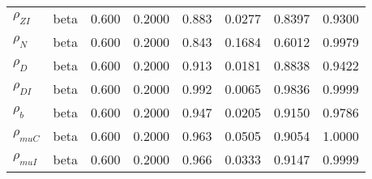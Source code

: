 \begin{center}
\begin{longtable}{llcccccc}
${\rho_{ZI}}$ & beta &   0.600 & 0.2000 &   0.883& 0.0277 &  0.8397 &  0.9300 \\ 
${\rho_N}$ & beta &   0.600 & 0.2000 &   0.843& 0.1684 &  0.6012 &  0.9979 \\ 
${\rho_D}$ & beta &   0.600 & 0.2000 &   0.913& 0.0181 &  0.8838 &  0.9422 \\ 
${\rho_{DI}}$ & beta &   0.600 & 0.2000 &   0.992& 0.0065 &  0.9836 &  0.9999 \\ 
${\rho_b}$ & beta &   0.600 & 0.2000 &   0.947& 0.0205 &  0.9150 &  0.9786 \\ 
${\rho_{muC}}$ & beta &   0.600 & 0.2000 &   0.963& 0.0505 &  0.9054 &  1.0000 \\ 
${\rho_{muI}}$ & beta &   0.600 & 0.2000 &   0.966& 0.0333 &  0.9147 &  0.9999 \\ 
\end{longtable}
 \end{center}
